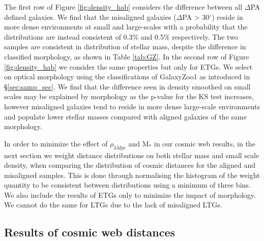 The first row of Figure \ref{fig:density_hab} considers the difference between all $\Delta$PA defined galaxies. We find that the misaligned galaxies ($\Delta$PA > 30$^{\circ}$) reside in more dense environments at small and large-scales with a probability that the distributions are instead consistent of 0.3\% and 0.5\% respectively. The two samples are consistent in distribution of stellar mass, despite the difference in classified morphology, as shown in Table \ref{tab:GZ}. In the second row of Figure \ref{fig:density_hab} we consider the same properties but only for ETGs. We select on optical morphology using the classifications of GalaxyZoo1 as introduced in \S\ref{sec:samp_sec}. We find that the difference seen in density smoothed on small scales may be explained by morphology as the p-value for the KS test increases, however misaligned galaxies tend to reside in more dense large-scale environments and populate lower stellar masses compared with aligned galaxies of the same morphology.

In order to minimize the effect of $\rho_{3Mpc}$ and $\mathrm{M_{\ast}}$ in our cosmic web results, in the next section we weight distance distributions on both stellar mass and small scale density, when comparing the distribution of cosmic distances for the aligned and misaligned samples. This is done through normalising the histogram of the weight quantity to be consistent between distributions using a minimum of three bins. We also include the results of ETGs only to minimize the impact of morphology. We cannot do the same for LTGs due to the lack of misaligned LTGs. 

\subsection{Results of cosmic web distances} \label{sec:cw_res}


